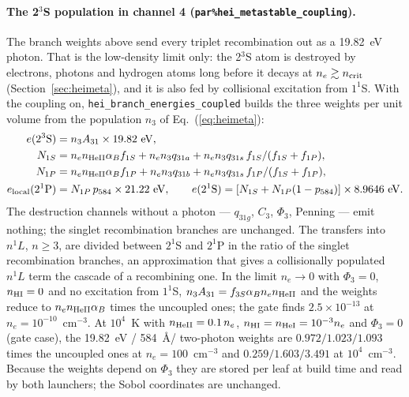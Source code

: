 \documentclass[english,a4paper]{my_memo}
\newcommand{\code}[1]{\texttt{#1}}
\begin{document}
\paragraph{The 2$^3$S population in channel 4
(\code{par\%hei\_metastable\_coupling}).}
\label{sec:heidiffuse}
The branch weights above send every triplet recombination out as a 19.82~eV
photon.  That is the low-density limit only: the 2$^3$S atom is destroyed by
electrons, photons and hydrogen atoms long before it decays at $n_e\gtrsim
n_{\rm crit}$ (Section~\ref{sec:heimeta}), and it is also fed by
collisional excitation from $1^1$S.  With the coupling on,
\code{hei\_branch\_energies\_coupled} builds the three weights per unit
volume from the population $n_3$ of Eq.~(\ref{eq:heimeta}):
\begin{equation}
\begin{aligned}
 e(2^3{\rm S}) &= n_3A_{31}\times19.82~{\rm eV},\\
 N_{1S} &= n_en_{\rm HeII}\alpha_Bf_{1S} + n_en_3q_{31a}
          + n_en_3q_{31s}\,f_{1S}/(f_{1S}+f_{1P}),\\
 N_{1P} &= n_en_{\rm HeII}\alpha_Bf_{1P} + n_en_3q_{31b}
          + n_en_3q_{31s}\,f_{1P}/(f_{1S}+f_{1P}),\\
 e_{\mathrm{local}}(2^1{\rm P}) &= N_{1P}\,p_{584}\times21.22~{\rm eV},\qquad
 e(2^1{\rm S}) = [N_{1S} + N_{1P}(1-p_{584})]\times8.9646~{\rm eV}.
\end{aligned}
\end{equation}
The destruction channels without a photon --- $q_{31g}$, $C_3$, $\Phi_3$,
Penning --- emit nothing; the singlet recombination branches are unchanged.
The transfers into $n^1L$, $n\ge3$, are divided between $2^1$S and $2^1$P
in the ratio of the singlet recombination branches, an approximation that
gives a collisionally populated $n^1L$ term the cascade of a recombining
one.  In the limit $n_e\rightarrow0$ with $\Phi_3=0$, $n_{\rm HI}=0$ and
no excitation from $1^1$S, $n_3A_{31} = f_{3S}\alpha_Bn_en_{\rm HeII}$ and
the weights reduce to $n_en_{\rm HeII}\alpha_B$ times the uncoupled ones;
the gate finds $2.5{\times}10^{-13}$ at $n_e = 10^{-10}$~cm$^{-3}$.  At
$10^4$~K with $n_{\rm HeII} = 0.1\,n_e$, $n_{\rm HI} = n_{\rm HeI} =
10^{-3}n_e$ and $\Phi_3 = 0$ (gate case), the 19.82~eV / 584~\AA / two-photon
weights are $0.972 / 1.023 / 1.093$ times the uncoupled ones at
$n_e = 100$~cm$^{-3}$ and $0.259 / 1.603 / 3.491$ at $10^4$~cm$^{-3}$.
Because the weights depend on $\Phi_3$ they are stored per leaf at build
time and read by both launchers; the Sobol coordinates are unchanged.
\end{document}
